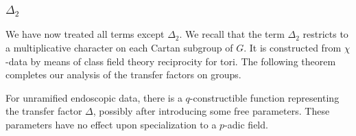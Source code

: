 \subsubsection{$\Delta_2$}

We have now treated all terms except $\Delta_2$.  We recall that the
term $\Delta_2$ restricts to a multiplicative character on each Cartan
subgroup of $G$.  It is constructed from $\chi$-data by means of class
field theory reciprocity for tori.  The following theorem completes
our analysis of the transfer factors on groups.

\begin{theorem}\label{thm:delta2}  For unramified endoscopic data,
  there is a $q$-constructible function representing the transfer
  factor $\Delta$, possibly after introducing some free parameters.
  These parameters have no effect upon specialization to a $p$-adic
  field.
\end{theorem}

